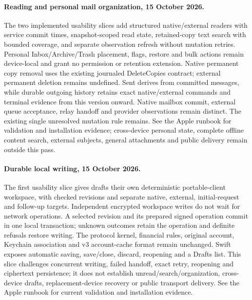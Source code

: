 \documentclass[11pt]{article}
\begin{document}
\paragraph{Reading and personal mail organization, 15 October 2026.}
The two implemented usability slices add structured native/external readers with service
commit times, snapshot-scoped read state, retained-copy text search with bounded
coverage, and separate observation refresh without mutation retries. Personal
Inbox/Archive/Trash placement, flags, restore and bulk actions remain device-local
and grant no permission or retention extension. Native permanent copy removal
uses the existing journaled DeleteCopies contract; external permanent deletion
remains undefined. Sent derives from committed messages, while durable outgoing
history retains exact native/external commands and terminal evidence from this
version onward. Native mailbox commit, external queue acceptance, relay handoff
and provider observations remain distinct. The existing single unresolved
mutation rule remains. See the Apple runbook for validation and installation
evidence; cross-device personal state, complete offline content search, external
subjects, general attachments and public delivery remain outside this pass.

\paragraph{Durable local writing, 15 October 2026.}
The first usability slice gives drafts their own deterministic portable-client
workspace, with checked revisions and separate native, external, initial-request
and follow-up targets. Independent encrypted workspace writes do not wait for
network operations. A selected revision and its prepared signed operation commit
in one local transaction; unknown outcomes retain the operation and definite
refusals restore writing. The protocol kernel, financial rules, original account,
Keychain association and v3 account-cache format remain unchanged. Swift exposes
automatic saving, save/close, discard, reopening and a Drafts list. This slice
challenges concurrent writing, failed handoff, exact retry, reopening and
ciphertext persistence; it does not establish unread/search/organization,
cross-device drafts, replacement-device recovery or public transport delivery.
See the Apple runbook for current validation and installation evidence.
\end{document}
